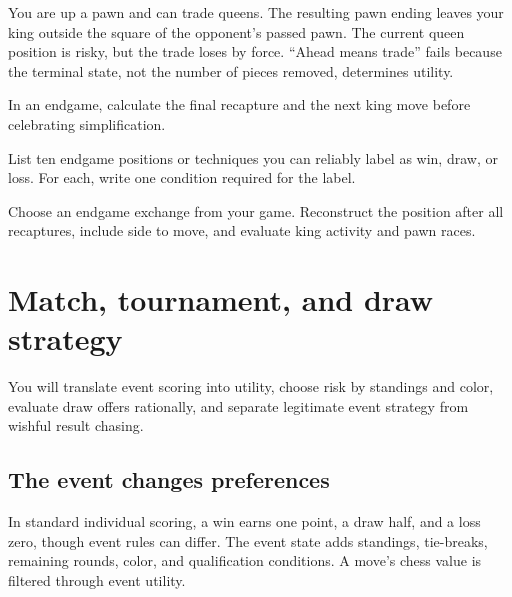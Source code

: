\begin{workedbox}[title={Worked example: simplify into what?}]
You are up a pawn and can trade queens. The resulting pawn ending leaves your king outside the square of the opponent's passed pawn. The current queen position is risky, but the trade loses by force. ``Ahead means trade'' fails because the terminal state, not the number of pieces removed, determines utility.
\end{workedbox}

\begin{memorybox}
In an endgame, calculate the final recapture and the next king move before celebrating simplification.
\end{memorybox}

\begin{exercise}
List ten endgame positions or techniques you can reliably label as win, draw, or loss. For each, write one condition required for the label.
\end{exercise}

\begin{exercise}
Choose an endgame exchange from your game. Reconstruct the position after all recaptures, include side to move, and evaluate king activity and pawn races.
\end{exercise}


\chapter{Match, tournament, and draw strategy}
\begin{learningbox}
You will translate event scoring into utility, choose risk by standings and color, evaluate draw offers rationally, and separate legitimate event strategy from wishful result chasing.
\end{learningbox}

\section{The event changes preferences}
In standard individual scoring, a win earns one point, a draw half, and a loss zero, though event rules can differ. The event state adds standings, tie-breaks, remaining rounds, color, and qualification conditions. A move's chess value is filtered through event utility.

